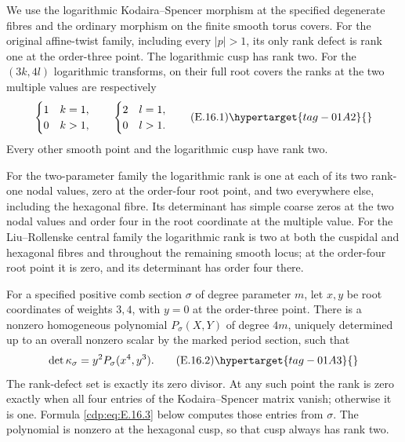 \begin{proposition}\hypertarget{tag-01GN}{}\label{cdp:st:E16}

We use the logarithmic Kodaira--Spencer morphism at the specified degenerate fibres and the ordinary morphism on the finite smooth torus covers. For the original affine-twist family, including every $|p|>1$, its only rank defect is rank one at the order-three point. The logarithmic cusp has rank two. For the $(3k,4l)$ logarithmic transforms, on their full root covers the ranks at the two multiple values are respectively
\[
 \begin{cases}1&k=1,\\0&k>1,\end{cases}
 \qquad
 \begin{cases}2&l=1,\\0&l>1.\end{cases}                 \tag{E.16.1}\hypertarget{tag-01A2}{}\label{cdp:eq:E.16.1}
\]
Every other smooth point and the logarithmic cusp have rank two.

For the two-parameter family the logarithmic rank is one at each of its two rank-one nodal values, zero at the order-four root point, and two everywhere else, including the hexagonal fibre. Its determinant has simple coarse zeros at the two nodal values and order four in the root coordinate at the multiple value. For the Liu--Rollenske central family the logarithmic rank is two at both the cuspidal and hexagonal fibres and throughout the remaining smooth locus; at the order-four root point it is zero, and its determinant has order four there.

For a specified positive comb section $\sigma$ of degree parameter $m$, let $x,y$ be root coordinates of weights $3,4$, with $y=0$ at the order-three point. There is a nonzero homogeneous polynomial $P_\sigma(X,Y)$ of degree $4m$, uniquely determined up to an overall nonzero scalar by the marked period section, such that
\[
 \det\kappa_\sigma=y^2P_\sigma(x^4,y^3).             \tag{E.16.2}\hypertarget{tag-01A3}{}\label{cdp:eq:E.16.2}
\]
The rank-defect set is exactly its zero divisor. At any such point the rank is zero exactly when all four entries of the Kodaira--Spencer matrix vanish; otherwise it is one. Formula \eqref{cdp:eq:E.16.3} below computes those entries from $\sigma$. The polynomial is nonzero at the hexagonal cusp, so that cusp always has rank two.
\end{proposition}


